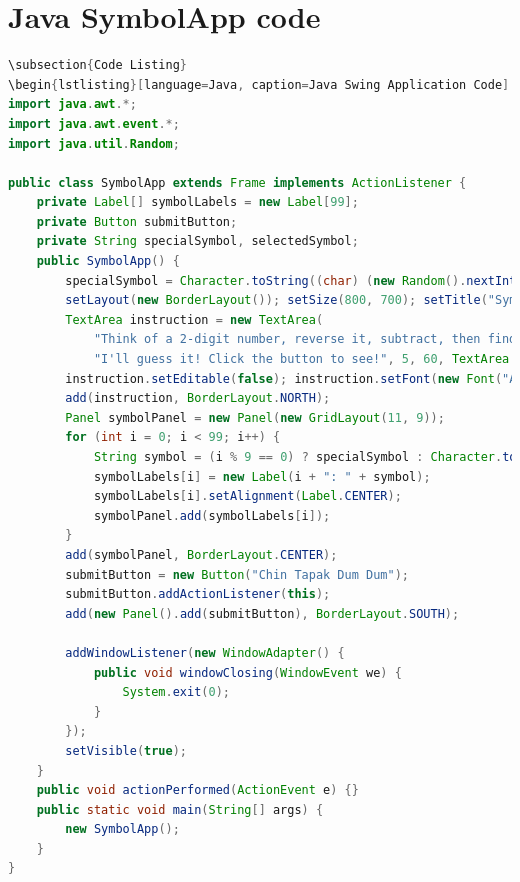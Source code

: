 \documentclass[12pt, a4paper]{article}
\begin{document}
\section*{Java SymbolApp code}
\begin{lstlisting}[language=Java, caption=Java Swing Application Code]
\subsection{Code Listing}
\begin{lstlisting}[language=Java, caption=Java Swing Application Code]
import java.awt.*;
import java.awt.event.*;
import java.util.Random;

public class SymbolApp extends Frame implements ActionListener {
    private Label[] symbolLabels = new Label[99];
    private Button submitButton;
    private String specialSymbol, selectedSymbol;
    public SymbolApp() {
        specialSymbol = Character.toString((char) (new Random().nextInt(94) + 33));
        setLayout(new BorderLayout()); setSize(800, 700); setTitle("Symbol App");
        TextArea instruction = new TextArea(
            "Think of a 2-digit number, reverse it, subtract, then find your symbol below.\n" +
            "I'll guess it! Click the button to see!", 5, 60, TextArea.SCROLLBARS_NONE);
        instruction.setEditable(false); instruction.setFont(new Font("Arial", Font.PLAIN, 16));
        add(instruction, BorderLayout.NORTH);
        Panel symbolPanel = new Panel(new GridLayout(11, 9));
        for (int i = 0; i < 99; i++) {
            String symbol = (i % 9 == 0) ? specialSymbol : Character.toString((char) (33 + (i % 94)));
            symbolLabels[i] = new Label(i + ": " + symbol);
            symbolLabels[i].setAlignment(Label.CENTER);
            symbolPanel.add(symbolLabels[i]);
        }
        add(symbolPanel, BorderLayout.CENTER);
        submitButton = new Button("Chin Tapak Dum Dum");
        submitButton.addActionListener(this);
        add(new Panel().add(submitButton), BorderLayout.SOUTH);

        addWindowListener(new WindowAdapter() {
            public void windowClosing(WindowEvent we) {
                System.exit(0);
            }
        });
        setVisible(true);
    }
    public void actionPerformed(ActionEvent e) {}
    public static void main(String[] args) {
        new SymbolApp();
    }
}
\end{lstlisting}

\newpage
{}
\vspace{-2cm}
\end{document}
